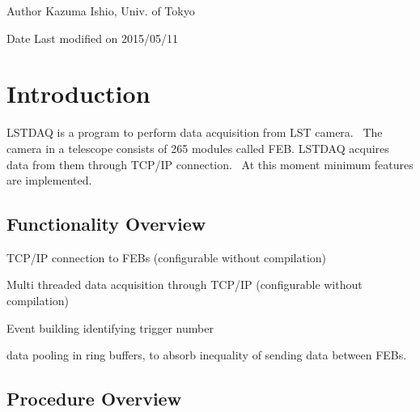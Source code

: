 \begin{DoxyAuthor}{Author}
Kazuma Ishio, Univ. of Tokyo 
\end{DoxyAuthor}
\begin{DoxyDate}{Date}
Last modified on 2015/05/11
\end{DoxyDate}
\hypertarget{index_INTRO}{}\section{Introduction}\label{index_INTRO}
L\+S\+T\+D\+A\+Q is a program to perform data acquisition from L\+S\+T camera.~\newline
 The camera in a telescope consists of 265 modules called F\+E\+B. L\+S\+T\+D\+A\+Q acquires data from them through T\+C\+P/\+I\+P connection.~\newline
 At this moment minimum features are implemented.\hypertarget{index_FUNCTIONALITY_OVERVIEW}{}\subsection{Functionality Overview}\label{index_FUNCTIONALITY_OVERVIEW}

\begin{DoxyItemize}
\item T\+C\+P/\+I\+P connection to F\+E\+Bs (configurable without compilation)
\item Multi threaded data acquisition through T\+C\+P/\+I\+P (configurable without compilation)
\item Event building identifying trigger number
\item data pooling in ring buffers, to absorb inequality of sending data between F\+E\+Bs.
\end{DoxyItemize}\hypertarget{index_PROC_OVERVIEW}{}\subsection{Procedure Overview}\label{index_PROC_OVERVIEW}


